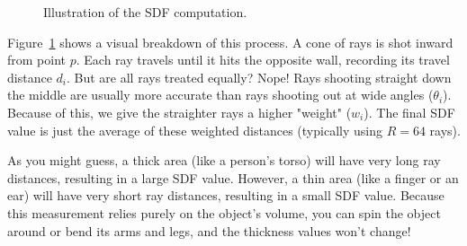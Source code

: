 \begin{figure}[H]
\centering
{}
\caption{Illustration of the SDF computation.}
\label{fig:sdf_concept}
\end{figure}

Figure~\ref{fig:sdf_concept} shows a visual breakdown of this process. A cone of rays is shot inward from point $p$. Each ray travels until it hits the opposite wall, recording its travel distance $d_i$. But are all rays treated equally? Nope! Rays shooting straight down the middle are usually more accurate than rays shooting out at wide angles ($\theta_i$). Because of this, we give the straighter rays a higher "weight" ($w_i$). The final SDF value is just the average of these weighted distances (typically using $R = 64$ rays).

As you might guess, a thick area (like a person's torso) will have very long ray distances, resulting in a large SDF value. However, a thin area (like a finger or an ear) will have very short ray distances, resulting in a small SDF value. Because this measurement relies purely on the object's volume, you can spin the object around or bend its arms and legs, and the thickness values won't change!

